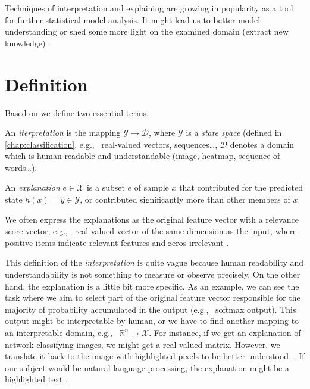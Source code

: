 Techniques of interpretation and explaining are growing in popularity as a tool for further statistical model analysis. It might lead us to better model understanding or shed some more light on the examined domain (extract new knowledge) \cite{Montavon2018}.

\section{Definition}
Based on \cite{Montavon2018} we define two essential terms.
\begin{definition}
An \emph{iterpretation} is the mapping $\mathcal{Y}\rightarrow\mathcal{D}$, where $\mathcal{Y}$ is a \emph{state space} (defined in \ref{chap:classification}, e.g., \ real-valued vectors, sequences\dots,  $\mathcal{D}$ denotes a domain which is human-readable and understandable (image, heatmap, sequence of words\dots).
\end{definition}


\begin{definition}
An \emph{explanation} $e \in \mathcal{X}$ is a subset $e$ of sample $x$ that contributed for the predicted state $h(x)=\hat{y} \in \mathcal{Y}$, or contributed significantly more than other members of $x$.
\end{definition}

We often express the explanations as the original feature vector with a relevance score vector, e.g., \ real-valued vector of the same dimension as the input, where positive items indicate relevant features and zeros irrelevant \cite{Montavon2018}.

This definition of the \emph{interpretation} is quite vague because human readability and understandability is not something to measure or observe precisely. On the other hand, the explanation is a little bit more specific. As an example, we can see the task where we aim to select part of the original feature vector responsible for the majority of probability accumulated in the output (e.g., \ softmax output). This output might be interpretable by human, or we have to find another mapping to an interpretable domain, e.g., \ $\mathbb{R}^{n}\rightarrow\mathcal{X}$. For instance, if we get an explanation of network classifying images, we might get a real-valued matrix. However, we translate it back to the image with highlighted pixels to be better understood. \cite{Lapuschkin2015, Simonyan2014, Landecker2013}. If our subject would be natural language processing, the explanation might be a highlighted text \cite{Arras2017, Li2016}.


